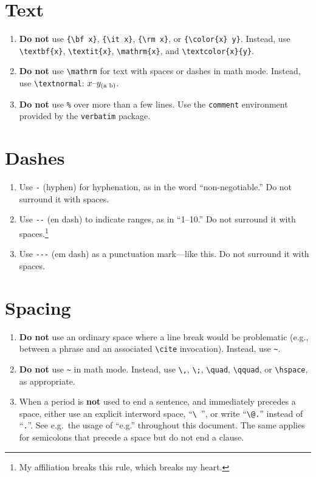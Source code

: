 \documentclass[
    prd, superscriptaddress, nofootinbib, amsmath, amssymb,
    aps, floatfix, preprintnumbers
]{revtex4-2}
\begin{document}
\section{Text}
\begin{enumerate}
    \item \textbf{Do not} use \verb|{\bf x}|, \verb|{\it x}|, \verb|{\rm x}|, or \verb|{\color{x} y}|. Instead, use \verb|\textbf{x}|, \verb|\textit{x}|, \verb|\mathrm{x}|, and \verb|\textcolor{x}{y}|.
    \item \textbf{Do not} use \verb|\mathrm| for text with spaces or dashes in math mode. Instead, use \verb|\textnormal|: $x\textnormal{--}y_{\textnormal{(a b)}}$.
    \item \textbf{Do not} use \verb|%| over more than a few lines. Use the \texttt{comment} environment provided by the \texttt{verbatim} package.
\end{enumerate}

\section{Dashes}
\begin{enumerate}
    \item Use \verb|-| (hyphen) for hyphenation, as in the word ``non-negotiable.'' Do not surround it with spaces.
    \item Use \verb|--| (en dash) to indicate ranges, as in ``1--10.'' Do not surround it with spaces.\footnote{My affiliation breaks this rule, which breaks my heart.}
    \item Use \verb|---| (em dash) as a punctuation mark---like this. Do not surround it with spaces.
\end{enumerate}

\section{Spacing}
\begin{enumerate}
    \item \textbf{Do not} use an ordinary space where a line break would be problematic (e.g., between a phrase and an associated \verb|\cite| invocation). Instead, use \verb|~|.
    \item \textbf{Do not} use \verb|~| in math mode. Instead, use \verb|\,|, \verb|\;|, \verb|\quad|, \verb|\qquad|, or \verb|\hspace|, as appropriate.
    \item When a period is \textbf{not} used to end a sentence, and immediately precedes a space, either use an explicit interword space, ``\verb|\ |'', or write ``\verb|\@.|'' instead of ``\verb|.|''. See e.g.\ the usage of ``e.g.'' throughout this document. The same applies for semicolons that precede a space but do not end a clause.
\end{enumerate}
\end{document}
